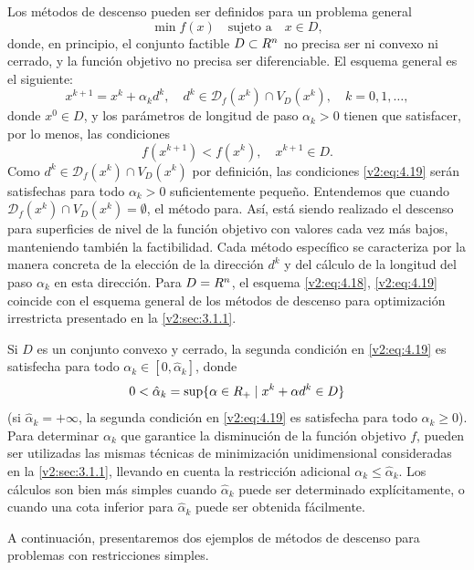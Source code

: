 
Los métodos de descenso pueden ser definidos para un problema general
\begin{equation}
    \min f(x) \quad \text{sujeto a} \quad x \in D,
    \label{v2:eq:4.17}
\end{equation}
donde, en principio, el conjunto factible $D \subset R^n$ no precisa ser ni convexo ni cerrado, y la función objetivo no precisa ser diferenciable. El esquema general es el siguiente:
\begin{equation}
    x^{k+1} = x^k + \alpha_k d^k, \quad d^k \in \mathcal{D}_f(x^k) \cap V_D(x^k), \quad k = 0, 1, \dots,
    \label{v2:eq:4.18}
\end{equation}
donde $x^0 \in D$, y los parámetros de longitud de paso $\alpha_k > 0$ tienen que satisfacer, por lo menos, las condiciones
\begin{equation}
    f(x^{k+1}) < f(x^k), \quad x^{k+1} \in D.
    \label{v2:eq:4.19}
\end{equation}
Como $d^k \in \mathcal{D}_f(x^k) \cap V_D(x^k)$ por definición, las condiciones \eqref{v2:eq:4.19} serán satisfechas para todo $\alpha_k > 0$ suficientemente pequeño. Entendemos que cuando $\mathcal{D}_f(x^k) \cap V_D(x^k) = \emptyset$, el método para.
Así, está siendo realizado el descenso para superficies de nivel de la función objetivo con valores cada vez más bajos, manteniendo también la factibilidad. Cada método específico se caracteriza por la manera concreta de la elección de la dirección $d^k$ y del cálculo de la longitud del paso $\alpha_k$ en esta dirección. Para $D = R^n$, el esquema \eqref{v2:eq:4.18}, \eqref{v2:eq:4.19} coincide con el esquema general de los métodos de descenso para optimización irrestricta presentado en la \cref{v2:sec:3.1.1}.

Si $D$ es un conjunto convexo y cerrado, la segunda condición en \eqref{v2:eq:4.19} es satisfecha para todo $\alpha_k \in [0, \hat{\alpha}_k]$, donde
\begin{equation}
    0 < \hat{\alpha}_k = \sup \{\alpha \in R_+ \mid x^k + \alpha d^k \in D\}
    \label{v2:eq:4.20}
\end{equation}
(si $\hat{\alpha}_k = +\infty$, la segunda condición en \eqref{v2:eq:4.19} es satisfecha para todo $\alpha_k \ge 0$). Para determinar $\alpha_k$ que garantice la disminución de la función objetivo $f$, pueden ser utilizadas las mismas técnicas de minimización unidimensional consideradas en la \cref{v2:sec:3.1.1}, llevando en cuenta la restricción adicional $\alpha_k \le \hat{\alpha}_k$. Los cálculos son bien más simples cuando $\hat{\alpha}_k$ puede ser determinado explícitamente, o cuando una cota inferior para $\hat{\alpha}_k$ puede ser obtenida fácilmente.


A continuación, presentaremos dos ejemplos de métodos de descenso para problemas con restricciones simples.